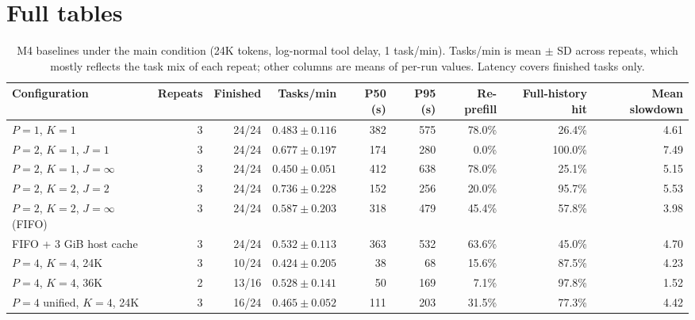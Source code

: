 \documentclass[9pt,twocolumn]{extarticle}
\begin{document}
\section{Full tables}

\begin{table}[h]
\centering
\footnotesize
\setlength{\tabcolsep}{4pt}
\caption{M4 baselines under the main condition (24K tokens, log-normal tool delay, 1 task/min). Tasks/min is mean $\pm$ SD across repeats, which mostly reflects the task mix of each repeat; other columns are means of per-run values. Latency covers finished tasks only.}
\begin{tabular}{@{}lrrrrrrrr@{}}
\toprule
Configuration & Repeats & Finished & Tasks/min & P50 (s) & P95 (s) & Re-prefill & Full-history hit & Mean slowdown \\
\midrule
$P=1$, $K=1$ & 3 & 24/24 & $0.483 \pm 0.116$ & 382 & 575 & 78.0\% & 26.4\% & 4.61 \\
$P=2$, $K=1$, $J=1$ & 3 & 24/24 & $0.677 \pm 0.197$ & 174 & 280 & 0.0\% & 100.0\% & 7.49 \\
$P=2$, $K=1$, $J=\infty$ & 3 & 24/24 & $0.450 \pm 0.051$ & 412 & 638 & 78.0\% & 25.1\% & 5.15 \\
$P=2$, $K=2$, $J=2$ & 3 & 24/24 & $0.736 \pm 0.228$ & 152 & 256 & 20.0\% & 95.7\% & 5.53 \\
$P=2$, $K=2$, $J=\infty$ (FIFO) & 3 & 24/24 & $0.587 \pm 0.203$ & 318 & 479 & 45.4\% & 57.8\% & 3.98 \\
FIFO + 3 GiB host cache & 3 & 24/24 & $0.532 \pm 0.113$ & 363 & 532 & 63.6\% & 45.0\% & 4.70 \\
$P=4$, $K=4$, 24K & 3 & 10/24 & $0.424 \pm 0.205$ & 38 & 68 & 15.6\% & 87.5\% & 4.23 \\
$P=4$, $K=4$, 36K & 2 & 13/16 & $0.528 \pm 0.141$ & 50 & 169 & 7.1\% & 97.8\% & 1.52 \\
$P=4$ unified, $K=4$, 24K & 3 & 16/24 & $0.465 \pm 0.052$ & 111 & 203 & 31.5\% & 77.3\% & 4.42 \\
\bottomrule
\end{tabular}
\end{table}
\end{document}
